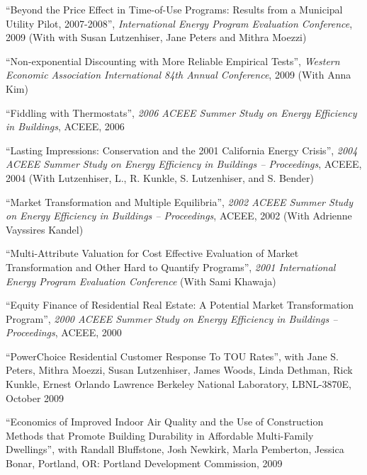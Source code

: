 \documentclass[Computer Science]{vita}
\begin{document}
\begin{vita}
\begin{Publications}
\begin{Papers at Refereed Conferences}
    \item ``Beyond the Price Effect in Time-of-Use Programs: Results
      from a Municipal Utility Pilot, 2007-2008'', \emph{International
        Energy Program Evaluation Conference}, 2009 (With with Susan
      Lutzenhiser, Jane Peters and Mithra Moezzi)

    \item ``Non-exponential Discounting with More Reliable Empirical
      Tests'', \emph{Western Economic Association International 84th
        Annual Conference}, 2009 (With Anna Kim)

    \item ``Fiddling with Thermostats'', \emph{2006 ACEEE Summer Study
        on Energy Efficiency in Buildings}, ACEEE, 2006

    \item ``Lasting Impressions: Conservation and the 2001 California
      Energy Crisis'', \emph{2004 ACEEE Summer Study on Energy
        Efficiency in Buildings -- Proceedings}, ACEEE, 2004 (With
      Lutzenhiser, L., R. Kunkle, S. Lutzenhiser, and S. Bender)

    \item ``Market Transformation and Multiple Equilibria'',
      \emph{2002 ACEEE Summer Study on Energy Efficiency in Buildings
        -- Proceedings}, ACEEE, 2002 (With Adrienne Vayssires Kandel)
	
    \item ``Multi-Attribute Valuation for Cost Effective Evaluation of
      Market Transformation and Other Hard to Quantify Programs'',
      \emph{2001 International Energy Program Evaluation Conference}
      (With Sami Khawaja)
	
    \item ``Equity Finance of Residential Real Estate: A Potential
      Market Transformation Program'', \emph{2000 ACEEE Summer Study
        on Energy Efficiency in Buildings -- Proceedings}, ACEEE, 2000
    \end{Papers at Refereed Conferences}
   
    \begin{Unrefereed Public Reports}
    
    \item ``PowerChoice Residential Customer Response To TOU Rates'',
      with Jane S. Peters, Mithra Moezzi, Susan Lutzenhiser, James
      Woods, Linda Dethman, Rick Kunkle, Ernest Orlando Lawrence Berkeley National Laboratory, LBNL-3870E, October 2009
    
    \item ``Economics of Improved Indoor Air Quality and the Use of
      Construction Methods that Promote Building Durability in
      Affordable Multi-Family Dwellings'', with Randall Bluffstone,
      Josh Newkirk, Marla Pemberton, Jessica Bonar, Portland, OR:
      Portland Development Commission, 2009


\end{Unrefereed Public Reports}
\end{Publications}
\end{vita}
\end{document}
